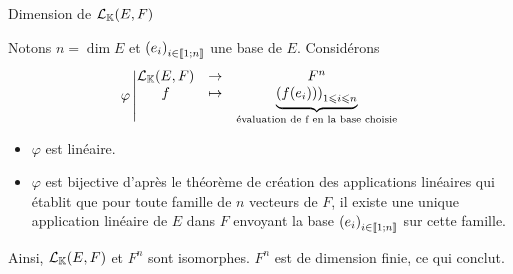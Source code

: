 \documentclass{article}
\renewenvironment{question_kholle}[2][ ]
{
	\subsection{\texorpdfstring{#2}{}}
	\notblank{#1}
	{
		\noindent #1
		\bigbreak
	}
	{}
	\begin{proof}
}
{
	\end{proof}
}
\begin{document}
	\begin{question_kholle}
		[$\mathcal{L}_\K(E,F)$ est dimension finie et
		\begin{equation}
			\dim \mathcal{L}_\K(E,F) = \dim E \times \dim F
		\end{equation}]
		{Dimension de $\mathcal{L}_\K(E,F)$}
		
		Notons $n = \dim E$ et $\left(e_i\right)_{i \in [\![ 1 ; n ]\!]}$ une base de $E$. Considérons
		\begin{equation*}
			\varphi
			\left| \begin{matrix}
				\mathcal{L}_{\mathbb K}(E,F) &\rightarrow& F^n \\
				f &\mapsto& \underbrace{\left(f(e_i))\right)_{1 \leqslant i \leqslant n}}_{\text{évaluation de f en la base choisie}}
			\end{matrix} \right.
		\end{equation*}
		
		\begin{itemize}[label=$*$]
			\item $\varphi$ est linéaire.
			\item $\varphi$ est bijective d'après le théorème de création des applications linéaires qui établit que pour toute famille de $n$ vecteurs de $F$, il existe une unique application linéaire de $E$ dans $F$ envoyant la base $\left(e_i\right)_{i \in [\![ 1 ; n ]\!]}$ sur cette famille.
		\end{itemize}
		
		Ainsi, $\mathcal{L}_\K(E,F)$ et $F^n$ sont isomorphes. $F^n$ est de dimension finie, ce qui conclut.
	\end{question_kholle}
	
\end{document}
